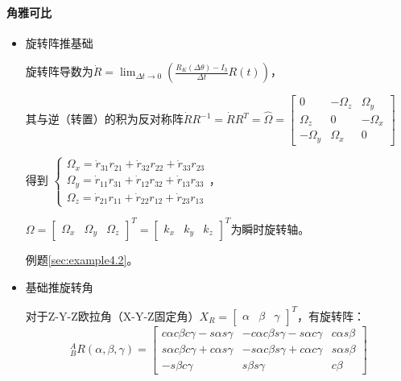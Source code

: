 \documentclass[
12pt, %
a4paper, 
oneside, %
headinclude,footinclude, %
]{scrartcl}
\begin{document}
\paragraph{角雅可比}
\begin{itemize}
\item 旋转阵推基础\label{sec:Rotation_matrix}

旋转阵导数为$ \dot{R} = \lim_{\Delta t \to 0} (\frac{R_K(\Delta\theta) - I_3}{\Delta t} R(t)) $，

其与逆（转置）的积为反对称阵$ \dot{R} R^{-1} = \dot{R} R^T = \hat{\Omega} = \begin{bmatrix} 0 & -\Omega_z & \Omega_y \\ \Omega_z & 0 & -\Omega_x \\ -\Omega_y & \Omega_x & 0 \end{bmatrix} $

得到
$
\begin{cases}
\Omega_x = \dot{r}_{31} r_{21} + \dot{r}_{32} r_{22} + \dot{r}_{33} r_{23} \\
\Omega_y = \dot{r}_{11} r_{31} + \dot{r}_{12} r_{32} + \dot{r}_{13} r_{33} \\
\Omega_z = \dot{r}_{21} r_{11} + \dot{r}_{22} r_{12} + \dot{r}_{23} r_{13}
\end{cases}
$，

$ \Omega = \begin{bmatrix} \Omega_x & \Omega_y & \Omega_z \end{bmatrix}^T = \begin{bmatrix} k_x & k_y & k_z \end{bmatrix}^T $为瞬时旋转轴。

例题\ref{sec:example4.2}。
\item 基础推旋转角

对于Z-Y-Z欧拉角（X-Y-Z固定角）$ X_R = \begin{bmatrix} \alpha & \beta & \gamma \end{bmatrix}^T $，有旋转阵：
$$
^A_B R(\alpha, \beta, \gamma) =
\begin{bmatrix}
c\alpha c\beta c\gamma - s\alpha s\gamma & -c\alpha c\beta s\gamma - s\alpha c\gamma & c\alpha s\beta \\
s\alpha c\beta c\gamma + c\alpha s\gamma & -s\alpha c\beta s\gamma + c\alpha c\gamma & s\alpha s\beta \\
-s\beta c\gamma & s\beta s\gamma & c\beta
\end{bmatrix}
$$


\end{itemize}
\end{document}
